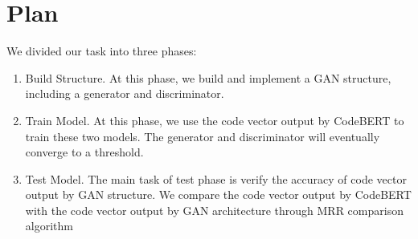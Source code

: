
\section{Plan}
{We divided our task into three phases:\\

\begin{enumerate}
\item Build Structure. At this phase, we build and implement a GAN structure, including a generator and discriminator.


\item Train Model. At this phase, we use the code vector output by CodeBERT to train these two models. The generator and discriminator will eventually converge to a threshold.


\item Test Model. The main task of test phase is verify the accuracy of code vector output by GAN structure. 
We compare the code vector output by CodeBERT with the code vector output by GAN architecture through MRR comparison algorithm
\end{enumerate}
}
